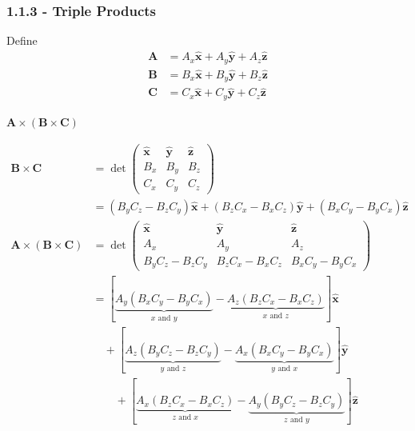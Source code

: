 \documentclass[a4paper]{article}
\begin{document}
\subsubsection{\textsf{1.1.3 - Triple Products}}

Define
\begin{align*}
	\pmb{A} & = A_{x}\pmb{\hat{x}} + A_{y}\pmb{\hat{y}} + A_{z}\pmb{\hat{z}} \\
	\pmb{B} & = B_{x}\pmb{\hat{x}} + B_{y}\pmb{\hat{y}} + B_{z}\pmb{\hat{z}} \\ 
	\pmb{C} & = C_{x}\pmb{\hat{x}} + C_{y}\pmb{\hat{y}} + C_{z}\pmb{\hat{z}}
\end{align*}

\underline{\( \pmb{A} \times \!\left( \pmb{B} \times \pmb{C} \right) \)}

\begin{align*}
	\pmb{B} \times \pmb{C} & = 
	\det \begin{pmatrix}
		\pmb{\hat{x}} & \pmb{\hat{y}} & \pmb{\hat{z}} \\
		B_{x} & B_{y} & B_{z} \\
		C_{x} & C_{y} & C_{z}
	\end{pmatrix} \\
	 & = \!\left( B_{y}C_{z} - B_{z}C_{y} \right)\pmb{\hat{x}} + \!\left( B_{z}C_{x} - B_{x}C_{z} \right)\pmb{\hat{y}} + \!\left( B_{x}C_{y} - B_{y}C_{x} \right)\pmb{\hat{z}} \\ 
	\pmb{A} \times \!\left( \pmb{B} \times \pmb{C} \right) & = 
	\det \begin{pmatrix}
		\pmb{\hat{x}} & \pmb{\hat{y}} & \pmb{\hat{z}} \\
		A_{x} & A_{y} & A_{z} \\
		B_{y}C_{z} - B_{z}C_{y} & B_{z}C_{x} - B_{x}C_{z} & B_{x}C_{y} - B_{y}C_{x}
	\end{pmatrix} \\
							       & = \!\left[ \underbrace{A_{y}\!\left( B_{x}C_{y} - B_{y}C_{x} \right)}_{x \text{ and } y} - \underbrace{A_{z}\!\left( B_{z}C_{x} - B_{x}C_{z} \right)}_{x \text{ and } z} \right]\pmb{\hat{x}} \\
							       & \quad + \!\left[ \underbrace{A_{z}\!\left( B_{y}C_{z} - B_{z}C_{y} \right)}_{y \text{ and } z} - \underbrace{A_{x}\!\left( B_{x}C_{y} - B_{y}C_{x} \right)}_{y \text{ and } x} \right]\pmb{\hat{y}} \\
							       & \qquad + \!\left[ \underbrace{A_{x}\!\left( B_{z}C_{x} - B_{x}C_{z} \right)}_{z \text{ and } x} - \underbrace{A_{y}\!\left( B_{y}C_{z} - B_{z}C_{y} \right)}_{z \text{ and } y} \right]\pmb{\hat{z}}
\end{align*}
\end{document}
